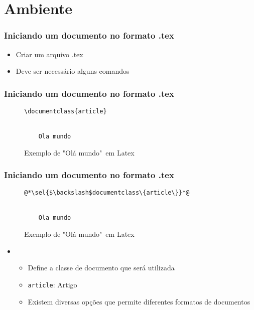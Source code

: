 \section{Ambiente}

\begin{frame} \frametitle{Iniciando um documento no formato .tex}
\begin{itemize}
	\item Criar um arquivo .tex
	\item Deve ser necessário alguns comandos
\end{itemize}
\end{frame}

\begin{frame}[fragile] \frametitle{Iniciando um documento no formato .tex}
\begin{figure}[!t]
\caption{Exemplo de "Olá mundo"~em Latex}
\begin{lstlisting}
\documentclass{article}


	Ola mundo

\end{lstlisting}
\ownsrc
\end{figure}
\end{frame}

\begin{frame}[fragile] \frametitle{Iniciando um documento no formato .tex}
\begin{figure}[!t]
\caption{Exemplo de "Olá mundo"~em Latex}
\begin{lstlisting}
@*\sel{$\backslash$documentclass\{article\}}*@


	Ola mundo

\end{lstlisting}
\ownsrc
\end{figure}

\begin{itemize}
	\item {}
	\begin{itemize}
		\item Define a classe de documento que será utilizada
		\item \texttt{article}: Artigo
		\item Existem diversas opções que permite diferentes formatos de documentos
	\end{itemize}
\end{itemize}

\end{frame}


